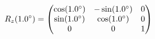 \documentclass[preview]{standalone}
\begin{document}
\begin{align*}
\special{dvisvgm:raw <g id='unique000'>}R_z(1.0^\circ) = \begin{pmatrix} \cos(1.0^\circ) & -\sin(1.0^\circ) & 0 \\ \sin(1.0^\circ) & \cos(1.0^\circ) & 0 \\ 0 & 0 & 1 \end{pmatrix}\special{dvisvgm:raw </g>}
\end{align*}
\end{document}
